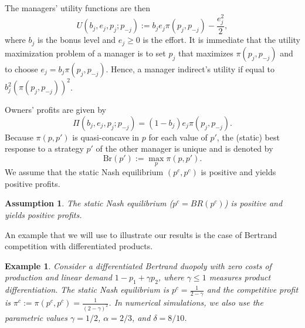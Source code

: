 \documentclass[]{article}
\newcommand{\B}{\mbox{Br}}
\newtheorem{assumption}{Assumption}
\newtheorem{example}{Example}
\begin{document}
The managers' utility functions are then 
\begin{equation}\label{managers_utility}
    U(b_j,e_j,p_j;p_{-j}) := b_j e_j \pi(p_j,p_{-j})-\frac{ e_j^2}{2},
\end{equation}
where $b_j$ is the bonus level and $e_j\geq 0$ is the effort. It is immediate that the utility maximization problem of a manager is to set $p_j$ that maximizes $\pi(p_j,p_{-j})$ and to choose $e_j=b_j\pi(p_j,p_{-j})$. Hence, a manager indirect's utility if equal to $b_j^2 (\pi(p_j,p_{-j}))^2$.

Owners' profits are given by 
%
\[\Pi(b_j,e_j,p_j;p_{-j})=(1-b_j)e_j\pi(p_j,p_{-j}).
\]
%
Because $\pi(p,p')$ is quasi-concave in $p$ for each value of $p'$, the (static) best response to a strategy $p'$ of the other manager is unique and is denoted by%
\begin{equation}
\B(p'):=\max_{p}\pi(p,p').
\end{equation}
%
We assume that the static Nash equilibrium $(p^c,p^c)$ is positive and yields positive profits.
\begin{assumption}\label{pc}
	The static Nash equilibrium ($p^c=BR(p^c)$) is positive and yields positive profits.
\end{assumption}
%
An example that we will use to illustrate our results is the case of Bertrand competition with differentiated products.

\begin{example}\label{ex1}
Consider a differentiated Bertrand duopoly with zero costs of production and linear demand $1-p_1+\gamma p_2$, where $\gamma\leq 1$ measures product differentiation. The static Nash equilibrium is $p^c=\frac{1}{2-\gamma}$ and the competitive profit is $\pi^c:=\pi(p^c,p^c)=\frac{1}{(2-\gamma)^2}$. In numerical simulations, we also use the parametric values $\gamma=1/2$, $\alpha=2/3$, and $\delta=8/10$.
\end{example}
\end{document}
